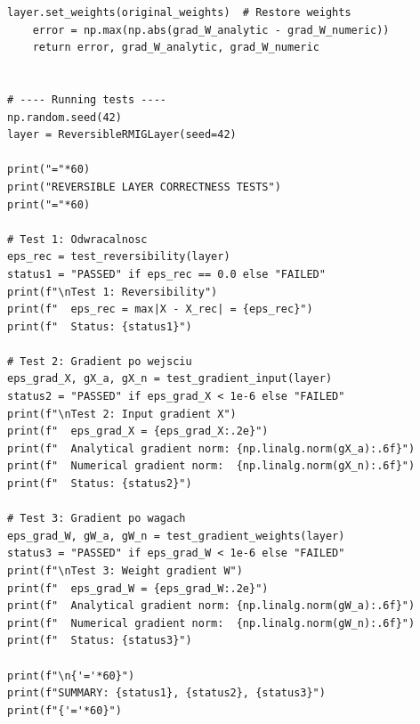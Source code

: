 \documentclass[11pt,a4paper]{report}
\begin{document}
\begin{lstlisting}[caption={Reversibility and gradient correctness tests}]
    layer.set_weights(original_weights)  # Restore weights
    error = np.max(np.abs(grad_W_analytic - grad_W_numeric))
    return error, grad_W_analytic, grad_W_numeric


# ---- Running tests ----
np.random.seed(42)
layer = ReversibleRMIGLayer(seed=42)

print("="*60)
print("REVERSIBLE LAYER CORRECTNESS TESTS")
print("="*60)

# Test 1: Odwracalnosc
eps_rec = test_reversibility(layer)
status1 = "PASSED" if eps_rec == 0.0 else "FAILED"
print(f"\nTest 1: Reversibility")
print(f"  eps_rec = max|X - X_rec| = {eps_rec}")
print(f"  Status: {status1}")

# Test 2: Gradient po wejsciu
eps_grad_X, gX_a, gX_n = test_gradient_input(layer)
status2 = "PASSED" if eps_grad_X < 1e-6 else "FAILED"
print(f"\nTest 2: Input gradient X")
print(f"  eps_grad_X = {eps_grad_X:.2e}")
print(f"  Analytical gradient norm: {np.linalg.norm(gX_a):.6f}")
print(f"  Numerical gradient norm:  {np.linalg.norm(gX_n):.6f}")
print(f"  Status: {status2}")

# Test 3: Gradient po wagach
eps_grad_W, gW_a, gW_n = test_gradient_weights(layer)
status3 = "PASSED" if eps_grad_W < 1e-6 else "FAILED"
print(f"\nTest 3: Weight gradient W")
print(f"  eps_grad_W = {eps_grad_W:.2e}")
print(f"  Analytical gradient norm: {np.linalg.norm(gW_a):.6f}")
print(f"  Numerical gradient norm:  {np.linalg.norm(gW_n):.6f}")
print(f"  Status: {status3}")

print(f"\n{'='*60}")
print(f"SUMMARY: {status1}, {status2}, {status3}")
print(f"{'='*60}")
\end{lstlisting}
\end{document}
